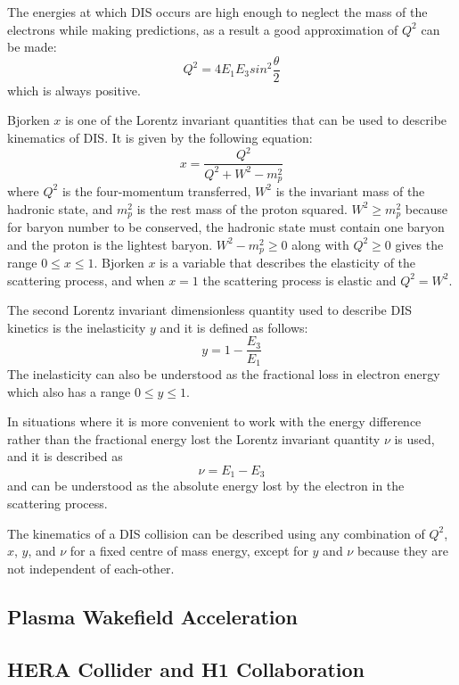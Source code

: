\documentclass[journal, a4paper,12pt]{IEEEtran}
\begin{document}
The energies at which DIS occurs are high enough to neglect the mass of the electrons while making predictions, as a result a good approximation of $Q^2$ can be made:
\begin{equation}
	Q^2 = 4E_1E_3sin^2\frac{\theta}{2}
\end{equation}
which is always positive.

Bjorken $x$ is one of the Lorentz invariant quantities that can be used to describe kinematics of DIS. It is given by the following equation: 
\begin{equation}
	x = \frac{Q^2}{Q^2 + W^2 - m_p^2}
\end{equation}
where $Q^2$ is the four-momentum transferred, $W^2$ is the invariant mass of the hadronic state, and $m_p^2$ is the rest mass of the proton squared. $W^2 \geq m_p^2$ because for baryon number to be conserved, the hadronic state must contain one baryon and the proton is the lightest baryon. $W^2 - m_p^2 \geq 0$ along with $Q^2 \geq 0$ gives the range $0 \leq x \leq 1$. Bjorken $x$ is a variable that describes the elasticity of the scattering process, and when $x = 1$ the scattering process is elastic and $Q^2 = W^2$.

The second Lorentz invariant dimensionless quantity used to describe DIS kinetics is the inelasticity $y$ and it is defined as follows:
\begin{equation}
	y = 1-\frac{E_3}{E_1}
\end{equation}
The inelasticity can also be understood as the fractional loss in electron energy which also has a range $0 \leq y \leq 1$.

In situations where it is more convenient to work with the energy difference rather than the fractional energy lost the Lorentz invariant quantity $\nu$ is used, and it is described as
\begin{equation}
	\nu = E_1 - E_3
\end{equation}
and can be understood as the absolute energy lost by the electron in the scattering process.

The kinematics of a DIS collision can be described using any combination of $Q^2$, $x$, $y$, and $\nu$ for a fixed centre of mass energy, except for $y$ and $\nu$ because they are not independent of each-other.

\subsection{Plasma Wakefield Acceleration}



\subsection{HERA Collider and H1 Collaboration}
\end{document}
